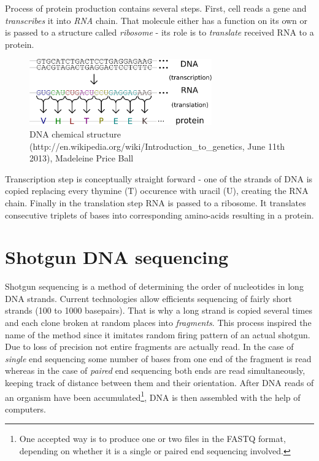 \documentclass[times, utf8, diplomski]{fer}
\begin{document}
Process of protein production contains several steps. First, cell reads a gene and \emph{transcribes} it into \emph{RNA} chain. That molecule either has a function on its own or is passed to a structure called \emph{ribosome} - its role is to \emph{translate} received RNA to a protein.
\\

\begin{figure}[!ht]
\begin{center}
	\includegraphics[width=0.7\textwidth]{../img/Genetic_code.pdf}
	\caption{DNA chemical structure (http://en.wikipedia.org/wiki/Introduction\_to\_genetics, June 11th 2013), Madeleine Price Ball}\label{genetic.code}
\end{center}
\end{figure}

Transcription step is conceptually straight forward - one of the strands of DNA is copied replacing every thymine (T) occurence with uracil (U), creating the RNA chain. Finally in the translation step RNA is passed to a ribosome. It translates consecutive triplets of bases into corresponding amino-acids resulting in a protein. 

\section{Shotgun DNA sequencing}

Shotgun sequencing is a method of determining the order of nucleotides in long DNA strands. Current technologies allow efficients sequencing of fairly short strands (100 to 1000 basepairs). That is why a long strand is copied several times and each clone broken at random places into \emph{fragments}. This process inspired the name of the method since it imitates random firing pattern of an actual shotgun. Due to loss of precision not entire fragments are actually read. In the case of \emph{single} end sequencing some number of bases from one end of the fragment is read whereas in the case of \emph{paired} end sequencing both ends are read simultaneously, keeping track of distance between them and their orientation. After DNA reads of an organism have been accumulated\footnote{One accepted way is to produce one or two files in the FASTQ format, depending on whether it is a single or paired end sequencing involved.}, DNA is then assembled with the help of computers. 
\end{document}
